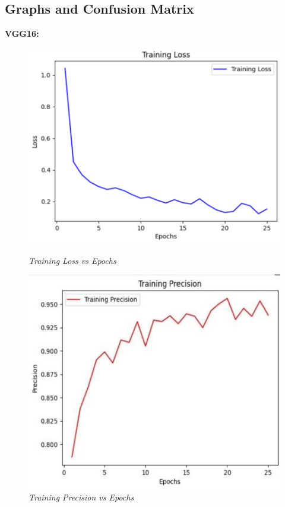 \documentclass[12pt, a4paper]{report}
\begin{document}
\subsection{Graphs and Confusion Matrix}
\textbf{VGG16:}

\begin{figure}[htbp]
    \centering
    \begin{minipage}{0.4\textwidth}
        \centering
        \includegraphics[width=\linewidth]{report images/image9.png}
        \caption{\textit{Training Loss vs Epochs}}
    \end{minipage}%
    \hspace{0.05\textwidth} %
    \begin{minipage}{0.4\textwidth}
        \centering
        \includegraphics[width=\linewidth]{report images/image10.png}
        \caption{\textit{Training Precision vs Epochs}}
    \end{minipage}
\end{figure}
\end{document}

